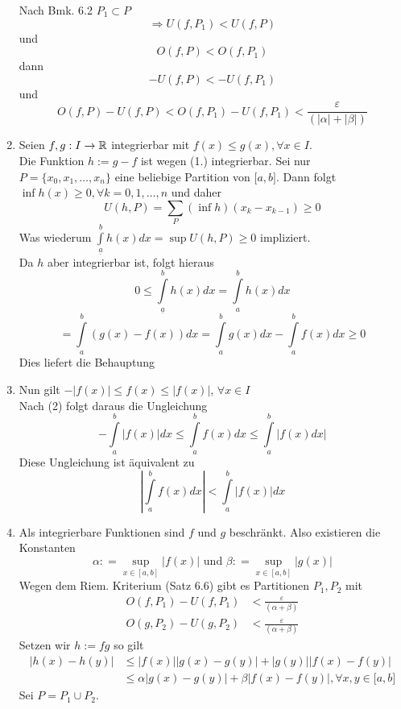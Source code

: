 \begin{enumerate}
Nach Bmk. 6.2 $P_1\subset P$
\[\Rightarrow U(f,P_1)<U(f,P)\] und \[O(f,P)<O(f,P_1)\]
dann \[-U(f,P)<-U(f,P_1)\] und \[O(f,P)-U(f,P)<O(f,P_1)-U(f,P_1)<\frac{\varepsilon}{(\left| \alpha  \right| + \left| \beta  \right|)}\]

\item Seien $f,g:I\to\mathbb{R}$ integrierbar mit $f(x)\leq g(x), \forall x \in I$.\\
Die Funktion $h:=g-f$ ist wegen (1.) integrierbar. Sei nur $P=\{x_0,x_1,\dots,x_n\}$ eine beliebige Partition von $\lbrack a,b\rbrack$. Dann folgt $\inf h(x) \ge 0,\forall k = 0,1, \ldots ,n$ und daher \[U(h,P) = \sum\limits_P {(\inf h)({x_k} - {x_{k - 1}}) \ge 0} \]
Was wiederum $\int\limits_{\underline{a}}^b {h(x)dx = \sup U(h,P) \ge 0} $ impliziert. \\
Da $h$ aber integrierbar ist, folgt hieraus \[0 \le \int\limits_{\underline{a}}^b {h(x)dx = \int\limits_a^b {h(x)dx} } \]
\[ = \int\limits_a^b {(g(x) - f(x))dx = \int\limits_a^b {g(x)dx - \int\limits_a^b {f(x)dx} } }\geq 0 \]
Dies liefert die Behauptung
\item Nun gilt $ - \left| {f(x)} \right| \le f(x) \le \left| {f(x)} \right|$, $\forall x\in I$\\
Nach (2) folgt daraus die Ungleichung
\[ - \int\limits_a^b {\left| {f(x)} \right|dx}  \le \int\limits_a^b {f(x)dx}  \le \int\limits_a^b {\left| {f(x)dx} \right|} \]
Diese Ungleichung ist äquivalent zu
\[\left| {\int\limits_a^b {f(x)dx} } \right| < \int\limits_a^b {\left| {f(x)} \right|dx} \]
\item Als integrierbare Funktionen sind $f$ und $g$ beschränkt. Also existieren die Konstanten
\[\alpha : = \mathop {\sup }\limits_{x \in [a,b]} \left| {f(x)} \right|{\text{ und }}\beta : = \mathop {\sup }\limits_{x \in [a,b]} \left| {g(x)} \right|\]
Wegen dem Riem. Kriterium (Satz 6.6) gibt es Partitionen $P_1,P_2$ mit
\begin{align*}
O(f,P_1)-U(f,P_1)&<\frac{\varepsilon}{(\alpha + \beta)}\\
 O(g,P_2)-U(g,P_2)&<\frac{\varepsilon}{(\alpha + \beta)}
\end{align*}
Setzen wir $h:=fg$ so gilt
\begin{align*}
\left| {h(x) - h(y)} \right| &\le \left| {f(x)} \right|\left| {g(x) - g(y)} \right| + \left| {g(y)} \right|\left| {f(x) - f(y)} \right|\\
 &\le \alpha \left| {g(x) - g(y)} \right| + \beta \left| {f(x) - f(y)} \right|, \forall x,y\in \lbrack a,b\rbrack
\end{align*}
Sei $P=P_1\cup P_2$.\\

\end{enumerate}
